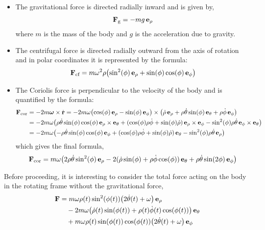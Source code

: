 \documentclass[12pt]{article}
\begin{document}
\begin{itemize}
  \item The gravitational force is directed radially inward and is given by,
  \begin{equation}
    \vb{F}_\text{g} = -mg\,\vb{e}_\rho
  \end{equation}
  where $m$ is the mass of the body and $g$ is the acceleration due to gravity.

  \item The centrifugal force is directed radially outward from the axis of rotation and in
        polar coordinates it is represented by the formula:
  \begin{equation}
    \vb{F}_\text{cf} = m\omega^2\rho\bigl(\sin^2(\phi)\,\vb{e}_\rho
      + \sin(\phi)\cos(\phi)\,\vb{e}_\phi\bigr)
    \label{eq:centrifugal_spherical}
  \end{equation}

  \item The Coriolis force is perpendicular to the velocity of the body and is quantified by
        the formula:
  \begin{align}
    \vb{F}_\text{cor}
    &= -2m\boldsymbol{\omega}\times\dot{\vb{r}}
     = -2m\omega\bigl(\cos(\phi)\,\vb{e}_\rho - \sin(\phi)\,\vb{e}_\phi\bigr)
       \times\bigl(\dot\rho\,\vb{e}_\rho + \rho\dot\theta\sin(\phi)\,\vb{e}_\theta + \rho\dot\phi\,\vb{e}_\phi\bigr) \nonumber \\
    &= -2m\omega\bigl(\rho\dot\theta\sin(\phi)\cos(\phi)\,\vb{e}_\rho\times\vb{e}_\theta
       + (\cos(\phi)\rho\dot\phi + \sin(\phi)\dot\rho)\,\vb{e}_\rho\times\vb{e}_\phi
       - \sin^2(\phi)\rho\dot\theta\,\vb{e}_\phi\times\vb{e}_\theta\bigr) \nonumber \\
    &= -2m\omega\bigl(-\rho\dot\theta\sin(\phi)\cos(\phi)\,\vb{e}_\phi
       + (\cos(\phi)\rho\dot\phi + \sin(\phi)\dot\rho)\,\vb{e}_\theta
       - \sin^2(\phi)\rho\dot\theta\,\vb{e}_\rho\bigr)
  \end{align}
  which gives the final formula,
  \begin{equation}
    \vb{F}_\text{cor} = m\omega\bigl(
      2\rho\dot\theta\sin^2(\phi)\,\vb{e}_\rho
      - 2(\dot\rho\sin(\phi) + \rho\dot\phi\cos(\phi))\,\vb{e}_\theta
      + \rho\dot\theta\sin(2\phi)\,\vb{e}_\phi\bigr)
    \label{eq:coriolis_spherical}
  \end{equation}
\end{itemize}

Before proceeding, it is interesting to consider the total force acting on the body in the
rotating frame without the gravitational force,
\begin{equation}
  \begin{aligned}
    \vb{F} &= m\omega\rho(t)\sin^2(\phi(t))\bigl(2\dot\theta(t)+\omega\bigr)\,\vb{e}_\rho \\
    &\quad - 2m\omega\bigl(\dot\rho(t)\sin(\phi(t)) + \rho(t)\dot\phi(t)\cos(\phi(t))\bigr)\,\vb{e}_\theta \\
    &\quad + m\omega\rho(t)\sin(\phi(t))\cos(\phi(t))\bigl(2\dot\theta(t)+\omega\bigr)\,\vb{e}_\phi
  \end{aligned}
\end{equation}
\end{document}
